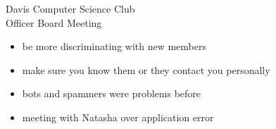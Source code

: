 \documentclass{article}
\begin{document}
\begin{Minutes}{Davis Computer Science Club\\Officer Board Meeting}
\begin{itemize}
\item be more discriminating with new members
\item make sure you know them or they contact you personally
\item bots and spammers were problems before
\end{itemize}

\begin{itemize}
\item meeting with Natasha over application error
\end{itemize}
\thispagestyle{creditfooter}
\end{Minutes}
\end{document}

